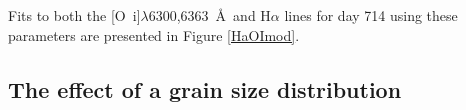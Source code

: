 Fits to both the [O~{\sc i}]$\lambda$6300,6363~\AA\ and H$\alpha$ lines for day 714 using these parameters are presented in Figure \ref{HaOImod}.


\subsection{The effect of a grain size distribution}
\label{gs_distn}

%
%
%
 
%



%
%

